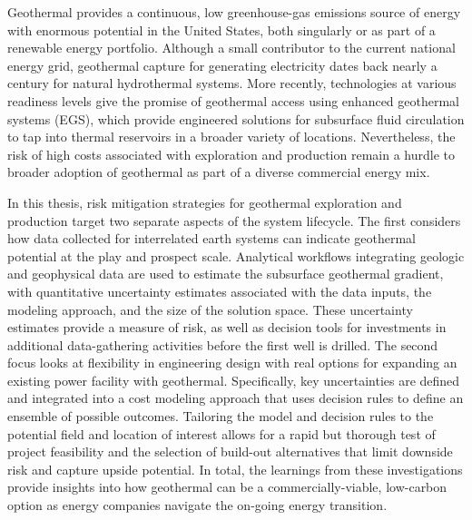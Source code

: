 % 
% 
%
Geothermal provides a continuous, low greenhouse-gas emissions source of energy with enormous potential in the United States, both singularly or as part of a renewable energy portfolio. Although a small contributor to the current national energy grid, geothermal capture for generating electricity dates back nearly a century for natural hydrothermal systems. More recently, technologies at various readiness levels give the promise of geothermal access using enhanced geothermal systems (EGS), which provide engineered solutions for subsurface fluid circulation to tap into thermal reservoirs in a broader variety of locations. Nevertheless, the risk of high costs associated with exploration and production remain a hurdle to broader adoption of geothermal as part of a diverse commercial energy mix.

In this thesis, risk mitigation strategies for geothermal exploration and production target two separate aspects of the system lifecycle. The first considers how data collected for interrelated earth systems can indicate geothermal potential at the play and prospect scale. Analytical workflows integrating geologic and geophysical data are used to estimate the subsurface geothermal gradient, with quantitative uncertainty estimates associated with the data inputs, the modeling approach, and the size of the solution space. These uncertainty estimates provide a measure of risk, as well as decision tools for investments in additional data-gathering activities before the first well is drilled. The second focus looks at flexibility in engineering design with real options for expanding an existing power facility with geothermal. Specifically, key uncertainties are defined and integrated into a cost modeling approach that uses decision rules to define an ensemble of possible outcomes. Tailoring the model and decision rules to the potential field and location of interest allows for a rapid but thorough test of project feasibility and the selection of build-out alternatives that limit downside risk and capture upside potential. In total, the learnings from these investigations provide insights into how geothermal can be a commercially-viable, low-carbon option as energy companies navigate the on-going energy transition.